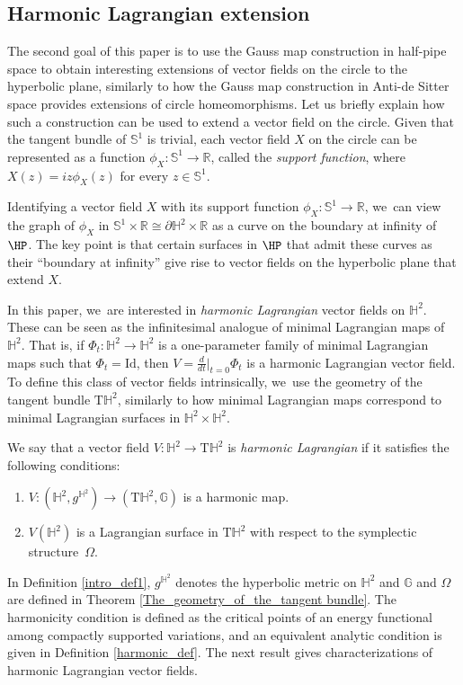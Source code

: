 \subsection{Harmonic Lagrangian extension}

The second goal of this paper is to use the Gauss map construction in half-pipe space to obtain interesting extensions of vector fields on the circle to the hyperbolic plane, similarly to how the Gauss map construction in Anti-de Sitter space provides extensions of circle homeomorphisms. Let us briefly explain how such a construction can be used to extend a vector field on the circle. Given that the tangent bundle of \(\mathbb{S}^1\) is trivial, each vector field \(X\) on the circle can be represented as a function \(\phi_X: \mathbb{S}^1 \to \mathbb{R}\), called the \emph{support function}, where \(X(z) = iz\phi_X(z)\) for every \(z \in \mathbb{S}^1\).

Identifying a vector field \(X\) with its support function \(\phi_X: \mathbb{S}^1 \to \mathbb{R}\), we~can view the graph of \(\phi_X\) in \(\mathbb{S}^1 \times \mathbb{R} \cong \partial \mathbb{H}^2 \times \mathbb{R}\) as a curve on the boundary at infinity of \(\HP\). The key point is that certain surfaces in \(\HP\) that admit these curves as their ``boundary at infinity'' give rise to vector fields on the hyperbolic plane that extend \(X\).

In this paper, we~are interested in \emph{harmonic Lagrangian} vector fields on \(\mathbb{H}^2\). These can be seen as the infinitesimal analogue of minimal Lagrangian maps of \(\mathbb{H}^2\). That is, if \(\Phi_t: \mathbb{H}^2 \to \mathbb{H}^2\) is a one-parameter family of minimal Lagrangian maps such that \(\Phi_t = \mathrm{Id}\), then \(V = \frac{d}{dt}\big\lvert_{t=0} \Phi_t\) is a harmonic Lagrangian vector field. To define this class of vector fields intrinsically, we~use the geometry of the tangent bundle \(\mathrm{T}\mathbb{H}^2\), similarly to how minimal Lagrangian maps correspond to minimal Lagrangian surfaces in \(\mathbb{H}^2 \times \mathbb{H}^2\).

\begin{defi}\label{intro_def1}
We say that a vector field \(V: \mathbb{H}^2 \to \mathrm{T}\mathbb{H}^2\) is \emph{harmonic Lagrangian} if it satisfies the following conditions:
\begin{enumerate}
\item \(V: (\mathbb{H}^2, g^{\mathbb{H}^2}) \to (\mathrm{T}\mathbb{H}^2, \mathbb{G})\) is a harmonic map.
\item \(V(\mathbb{H}^2)\) is a Lagrangian surface in \(\mathrm{T}\mathbb{H}^2\) with respect to the symplectic structure~\(\Omega\).
\end{enumerate}
\end{defi}
In Definition \ref{intro_def1}, \(g^{\mathbb{H}^2}\) denotes the hyperbolic metric on \(\mathbb{H}^2\) and \(\mathbb{G}\) and \(\Omega\) are defined in Theorem \ref{The_geometry_of_the_tangent bundle}. The harmonicity condition is defined as the critical points of an energy functional among compactly supported variations, and an equivalent analytic condition is given in Definition \ref{harmonic_def}. The next result gives characterizations of harmonic Lagrangian vector fields.

